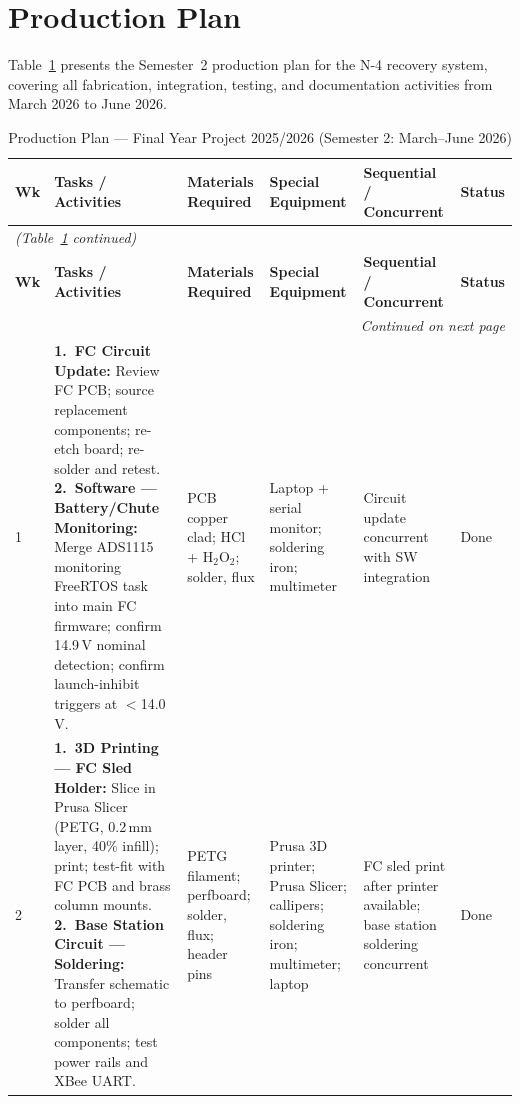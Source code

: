 \section{Production Plan}
\label{app:production_plan}

Table~\ref{tab:production_plan} presents the Semester~2 production plan for
the N-4 recovery system, covering all fabrication, integration, testing, and
documentation activities from March 2026 to June 2026.

\begin{longtable}{p{1cm}p{4.5cm}p{3cm}p{2.5cm}p{2.5cm}p{1.5cm}}
  \caption{Production Plan --- Final Year Project 2025/2026 (Semester 2: March--June 2026)}
  \label{tab:production_plan}\\
  \toprule
  \textbf{Wk} & \textbf{Tasks / Activities} & \textbf{Materials Required} & \textbf{Special Equipment} & \textbf{Sequential / Concurrent} & \textbf{Status}\\
  \midrule
  \endfirsthead
  \multicolumn{6}{l}{\small\textit{(Table~\ref{tab:production_plan} continued)}}\\
  \toprule
  \textbf{Wk} & \textbf{Tasks / Activities} & \textbf{Materials Required} & \textbf{Special Equipment} & \textbf{Sequential / Concurrent} & \textbf{Status}\\
  \midrule
  \endhead
  \midrule
  \multicolumn{6}{r}{\small\textit{Continued on next page}}\\
  \endfoot
  \bottomrule
  \endlastfoot

  1 &
  \textbf{1.\ FC Circuit Update:} Review FC PCB; source replacement components; re-etch board; re-solder and retest.
  \textbf{2.\ Software --- Battery/Chute Monitoring:} Merge ADS1115 monitoring FreeRTOS task into main FC firmware; confirm 14.9\,V nominal detection; confirm launch-inhibit triggers at $<$14.0\,V. &
  PCB copper clad; HCl + H$_2$O$_2$; solder, flux &
  Laptop + serial monitor; soldering iron; multimeter &
  Circuit update concurrent with SW integration &
  Done\\[4pt]

  2 &
  \textbf{1.\ 3D Printing --- FC Sled Holder:} Slice in Prusa Slicer (PETG, 0.2\,mm layer, 40\% infill); print; test-fit with FC PCB and brass column mounts.
  \textbf{2.\ Base Station Circuit --- Soldering:} Transfer schematic to perfboard; solder all components; test power rails and XBee UART. &
  PETG filament; perfboard; solder, flux; header pins &
  Prusa 3D printer; Prusa Slicer; callipers; soldering iron; multimeter; laptop &
  FC sled print after printer available; base station soldering concurrent &
  Done\\[4pt]


\end{longtable}
